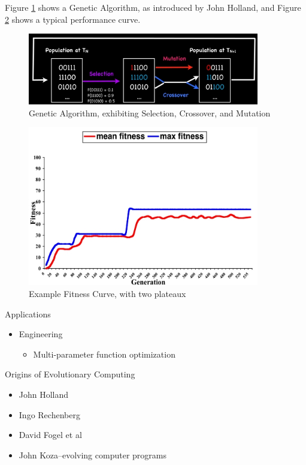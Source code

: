 \documentclass[]{article}
\begin{document}
Figure \ref{fig:GeneticAlgorithm} shows a Genetic Algorithm, as introduced by John Holland\cite{holland1992adaptation}, and Figure \ref{fig:GAfitness} shows a typical performance curve.

\begin{figure}
	\caption{Genetic Algorithm, exhibiting Selection, Crossover, and Mutation}\label{fig:GeneticAlgorithm}
	\includegraphics[width=0.9\textwidth]{GeneticAlgorithm}
\end{figure}

\begin{figure}
	\caption{Example Fitness Curve, with two plateaux}\label{fig:GAfitness}
	\includegraphics[width=0.9\textwidth]{GAfitness}
\end{figure}

Applications
\begin{itemize}
	\item  Engineering
	\begin{itemize}
		\item 	Multi-parameter function optimization\cite{marshall2014evolution}
	\end{itemize}
\end{itemize}

Origins of Evolutionary Computing

\begin{itemize}
	\item John Holland \cite{holland1992adaptation}
	\item Ingo Rechenberg \cite{rechenberg1965cybernetic}
	\item David Fogel et al\cite{fogel1998artificial}
	\item John Koza--evolving computer programs\cite{koza1992genetic}
\end{itemize}
\end{document}
